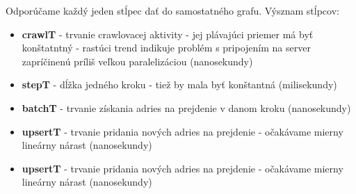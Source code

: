 Odporúčame každý jeden stĺpec dať do samostatného grafu. Výsznam stĺpcov: 
\begin{itemize}
    \item \textbf{crawlT} - trvanie crawlovacej aktivity - jej plávajúci priemer má byť konštatntný - rastúci trend indikuje problém s pripojením na server zapríčinenú príliš veľkou paralelizáciou (nanosekundy)
    \item \textbf{stepT} - dĺžka jedného kroku - tiež by mala byť konštantná (milisekundy)
    \item \textbf{batchT} - trvanie získania adries na prejdenie v danom kroku (nanosekundy)
    \item \textbf{upsertT} - trvanie pridania nových adries na prejdenie - očakávame mierny lineárny nárast (nanosekundy)
    \item \textbf{upsertT} - trvanie pridania nových adries na prejdenie - očakávame mierny lineárny nárast (nanosekundy)
\end{itemize}


\section{}